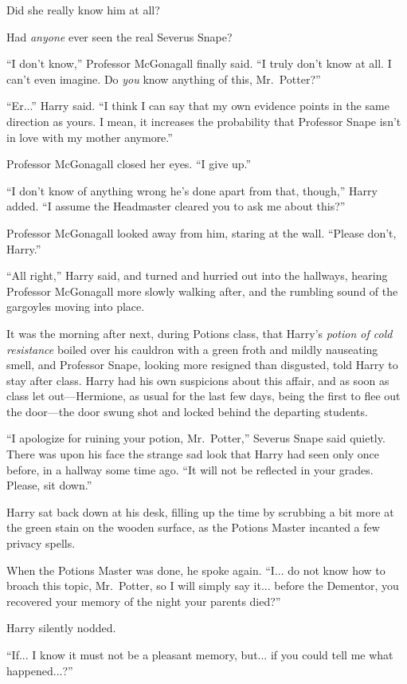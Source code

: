 Did she really know him at all?

Had \emph{anyone} ever seen the real Severus Snape?
\sbreak

“I don’t know,” Professor McGonagall finally said. “I truly don’t know at all. I can’t even imagine. Do \emph{you} know anything of this, Mr.~Potter?”

“Er...” Harry said. “I think I can say that my own evidence points in the same direction as yours. I mean, it increases the probability that Professor Snape isn’t in love with my mother anymore.”

Professor McGonagall closed her eyes. “I give up.”

“I don’t know of anything wrong he’s done apart from that, though,” Harry added. “I assume the Headmaster cleared you to ask me about this?”

Professor McGonagall looked away from him, staring at the wall. “Please don’t, Harry.”

“All right,” Harry said, and turned and hurried out into the hallways, hearing Professor McGonagall more slowly walking after, and the rumbling sound of the gargoyles moving into place.
\sbreak

It was the morning after next, during Potions class, that Harry’s \emph{potion of cold resistance} boiled over his cauldron with a green froth and mildly nauseating smell, and Professor Snape, looking more resigned than disgusted, told Harry to stay after class. Harry had his own suspicions about this affair, and as soon as class let out—Hermione, as usual for the last few days, being the first to flee out the door—the door swung shot and locked behind the departing students.

“I apologize for ruining your potion, Mr.~Potter,” Severus Snape said quietly. There was upon his face the strange sad look that Harry had seen only once before, in a hallway some time ago. “It will not be reflected in your grades. Please, sit down.”

Harry sat back down at his desk, filling up the time by scrubbing a bit more at the green stain on the wooden surface, as the Potions Master incanted a few privacy spells.

When the Potions Master was done, he spoke again. “I... do not know how to broach this topic, Mr.~Potter, so I will simply say it... before the Dementor, you recovered your memory of the night your parents died?”

Harry silently nodded.

“If... I know it must not be a pleasant memory, but... if you could tell me what happened...?”

